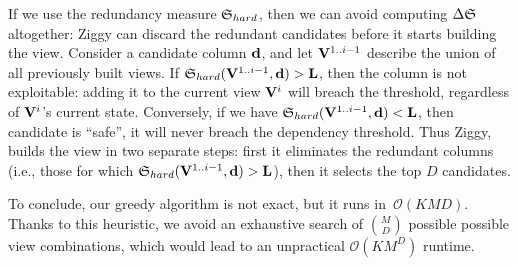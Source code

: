If we use the redundancy measure $\mathfrak{S}_{hard}$, then we can avoid computing $
\Delta\mathfrak{S}$ altogether: Ziggy can discard the redundant candidates before it
starts building the view.  Consider a candidate column $\bf{d}$, and let
$\mathbf{V}^{1..i-1}$ describe the union of all previously built views. If
$\mathfrak{S}_{hard} (\mathbf{V}^{1..i-1}, \bf{d}) > L$, then the column is not exploitable:
adding it to the current view $\mathbf{V}^{i}$ will breach the threshold,
regardless of $\mathbf{V}^{i}$'s current state.  Conversely, if we have
$\mathfrak{S}_{hard}(\mathbf{V}^{1..i-1},  \bf{d}) < L$, then candidate is ``safe'', it will
never breach the dependency threshold.  Thus Ziggy, builds the
view in two se\-parate steps: first it eliminates the redundant columns (i.e.,
those for which $\mathfrak{S}_{hard} (\mathbf{V}^{1..i-1},  \bf{d}) > L$), then it selects the
top $D$ candidates. 

To conclude, our greedy algorithm is not exact, but it runs
in~$\mathcal{O}(KMD)$. Thanks to this heuristic, we avoid an exhaustive search
of $\binom{M}{D}$ possible possible view combinations, which would lead to an
unpractical $\mathcal{O}(KM^D)$ runtime.


